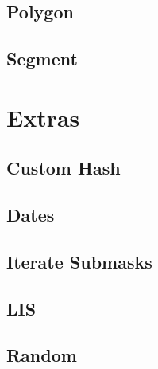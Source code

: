 \subsection{Polygon}
\raggedbottom
\hrulefill
\subsection{Segment}
\raggedbottom
\hrulefill
\newpage

\section{Extras}
\subsection{Custom Hash}
\raggedbottom
\hrulefill
\subsection{Dates}
\raggedbottom
\hrulefill
\subsection{Iterate Submasks}
\raggedbottom
\hrulefill
\subsection{LIS}
\raggedbottom
\hrulefill
\subsection{Random}
\raggedbottom
\hrulefill
\newpage

